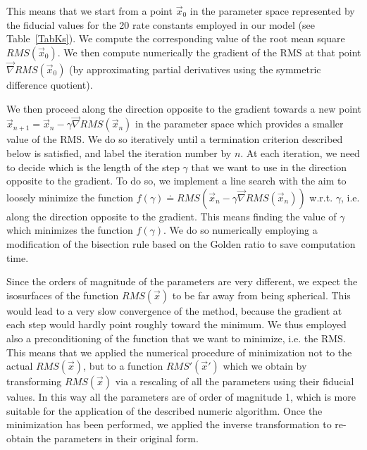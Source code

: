 \documentclass[oneside, 10pt, a4paper, twocolumn]{article}
\begin{document}
This means that we start from a point $\vec{x}_0$ in the parameter space represented by the fiducial values for the 20 rate constants employed in our model (see Table~\ref{TabKs}). We compute the corresponding value of the root mean square $RMS\left(\vec{x}_0\right)$. We then compute numerically the gradient of the RMS at that point $\vec{\nabla}RMS\left(\vec{x}_0\right)$ (by approximating partial derivatives using the symmetric difference quotient). 


We then proceed along the direction opposite to the gradient towards a new point \mbox{$\vec{x}_{n+1} = \vec{x}_{n} - \gamma\vec{\nabla}RMS\left(\vec{x}_n\right)$} in the parameter space which provides a smaller value of the RMS. We do so iteratively until a termination criterion described below is satisfied, and label the iteration number by $n$.
At each iteration, we need to decide which is the length of the step $\gamma$ that we want to use in the direction opposite to the gradient. To do so, we implement a line search with the aim to loosely minimize the function $f\left(\gamma\right) \doteq RMS\left(\vec{x}_{n} - \gamma\vec{\nabla}RMS\left(\vec{x}_n\right)\right)$ w.r.t. $\gamma$, i.e. along the direction opposite to the gradient. This means finding the value of $\gamma$ which minimizes the function $f\left(\gamma\right)$. We do so numerically employing a modification of the bisection rule based on the Golden ratio to save computation time. 

Since the orders of magnitude of the parameters are very different, we expect the isosurfaces of the function $RMS\left(\vec{x}\right)$ to be far away from being spherical. This would lead to a very slow convergence of the method, because the gradient at each step would hardly point roughly toward the minimum. We thus employed also a preconditioning of the function that we want to minimize, i.e. the RMS. This means that we applied the numerical procedure of minimization not to the actual $RMS\left(\vec{x}\right)$, but to a function $RMS'\left(\vec{x}'\right)$ which we obtain by transforming $RMS\left(\vec{x}\right)$ via a rescaling of all the parameters using their fiducial values. In this way all the parameters are of order of magnitude 1, which is more suitable for the application of the described numeric algorithm. Once the minimization has been performed, we applied the inverse transformation to re-obtain the parameters in their original form.
\end{document}
